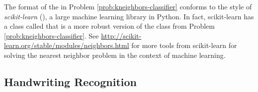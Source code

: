 \begin{info}
The format of the  in Problem \ref{prob:kneighbors-classifier} conforms to the style of \emph{scikit-learn} (), a large machine learning library in Python.
In fact, scikit-learn has a class called  that is a more robust version of the class from Problem \ref{prob:kneighbors-classifier}.
See \url{http://scikit-learn.org/stable/modules/neighbors.html} for more tools from scikit-learn for solving the nearest neighbor problem in the context of machine learning.
\end{info}

\subsection*{Handwriting Recognition} %

